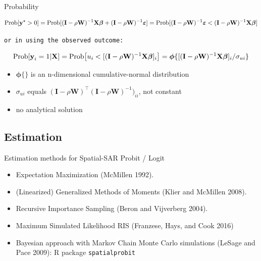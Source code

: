 \documentclass[
  letterpaper,
  DIV=11,
  numbers=noendperiod]{scrreprt}
\begin{document}
Probability

\[
        \mathrm{Prob}[{\boldsymbol{\mathbf{y}}^\star}>0]  = 
        \mathrm{Prob}[(\boldsymbol{\mathbf{I}} - \rho{\boldsymbol{\mathbf{W}}})^{-1}{\boldsymbol{\mathbf{X}}}{\boldsymbol{\mathbf{\beta}}} + 
        (\boldsymbol{\mathbf{I}} - \rho{\boldsymbol{\mathbf{W}}})^{-1}{\boldsymbol{\mathbf{\varepsilon}}}] \\
          =  \mathrm{Prob}[(\boldsymbol{\mathbf{I}} - \rho{\boldsymbol{\mathbf{W}}})^{-1}{\boldsymbol{\mathbf{\varepsilon}}} <
         (\boldsymbol{\mathbf{I}} - \rho{\boldsymbol{\mathbf{W}}})^{-1}{\boldsymbol{\mathbf{X}}}{\boldsymbol{\mathbf{\beta}}}] \nonumber
\]

\begin{verbatim}
or in using the observed outcome:
\end{verbatim}

\[
        \mathrm{Prob}[\boldsymbol{\mathbf{y}}_i=1 | \boldsymbol{\mathbf{X}}]  = 
        \mathrm{Prob}\big[u_i <
         [(\boldsymbol{\mathbf{I}} - \rho{\boldsymbol{\mathbf{W}}})^{-1}{\boldsymbol{\mathbf{X}}}{\boldsymbol{\mathbf{\beta}}}]_i\big] \\
          = \boldsymbol{\mathbf{\phi}}\{[(\boldsymbol{\mathbf{I}} - \rho{\boldsymbol{\mathbf{W}}})^{-1}{\boldsymbol{\mathbf{X}}}{\boldsymbol{\mathbf{\beta}}}]_i 
         / \sigma_{ui}\} 
\]

\begin{itemize}
\item
  \(\boldsymbol{\mathbf{\phi}}\{\}\) is an n-dimensional
  cumulative-normal distribution
\item
  \(\sigma_{ui}\) equals
  \((\boldsymbol{\mathbf{I}} - \rho{\boldsymbol{\mathbf{W}}})^\intercal (\boldsymbol{\mathbf{I}} - \rho{\boldsymbol{\mathbf{W}}})^{-1})_{ii}\),
  not constant
\item
  no analytical solution
\end{itemize}

\hypertarget{estimation}{%
\subsection{Estimation}\label{estimation}}

Estimation methods for Spatial-SAR Probit / Logit

\begin{itemize}
\item
  Expectation Maximization (McMillen 1992).
\item
  (Linearized) Generalized Methods of Moments (Klier and McMillen 2008).
\item
  Recursive Importance Sampling (Beron and Vijverberg 2004).
\item
  Maximum Simulated Likelihood RIS (Franzese, Hays, and Cook 2016)
\item
  Bayesian approach with Markov Chain Monte Carlo simulations (LeSage
  and Pace 2009): R package \texttt{spatialprobit}
\end{itemize}
\end{document}
